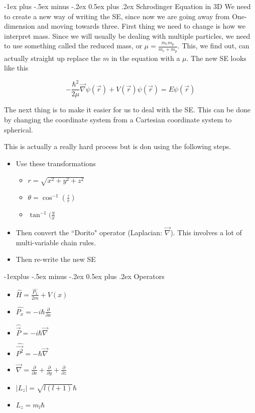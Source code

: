 \documentclass[10pt,landscape]{article}
\makeatletter
\renewcommand{\section}{\@startsection{section}{1}{0mm}%
                                {-1ex plus -.5ex minus -.2ex}%
                                {0.5ex plus .2ex}%
                                {\normalfont\large\bfseries}}
\renewcommand{\subsection}{\@startsection{subsection}{2}{0mm}%
                                {-1explus -.5ex minus -.2ex}%
                                {0.5ex plus .2ex}%
                                {\normalfont\normalsize\bfseries}}
\makeatother
\begin{document}
\begin{multicols}{3}
\section{Schrodinger Equation in 3D}
We need to create a new way of writing the SE, since now we are going away from One-dimension and moving towards three. First thing we need to change is how we interpret mass. Since we will usually be dealing with multiple particles, we need to use something called the reduced mass, or $\mu=\frac{m_em_p}{m_e+m_p}$. This, we find out, can actually straight up replace the $m$ in the equation with a $\mu$. The new SE looks like this

\begin{equation*}
    -\frac{\hbar^2}{2\mu}\Vec{\nabla}\psi(\Vec{r})+V(\Vec{r})\psi(\Vec{r})=E\psi(\Vec{r})
\end{equation*}{}

The next thing is to make it easier for us to deal with the SE. This can be done by changing the coordinate system from a Cartesian coordinate system to spherical. 

This is actually a really hard process but is don using the following steps.
\begin{itemize}
    \item Use these transformations
    \begin{itemize}
        \item $r=\sqrt{x^2+y^2+z^2}$
        \item $\theta=\cos^{-1}(\frac{z}{r})$
        \item $\tan^{-1}(\frac{y}{x}$
    \end{itemize}{}
    \item Then convert the ``Dorito" operator (Laplacian: $\Vec{\nabla}$). This involves a lot of multi-variable chain rules.
    \item Then re-write the new SE
\end{itemize}{}
\subsection{Operators}
\begin{itemize}
    \item $\hat{H}=\frac{\hat{P_x}}{2m}+V(x)$
    \item  $\hat{P_x}=-i\hbar\frac{\partial}{\partial x}$
    \item $\hat{\Vec{P}}=-i\hbar\Vec{\nabla}$
    \item $\hat{\Vec{P^2}}=-\hbar\Vec{\nabla}$
    \item  $\vec{\nabla}=\frac{\partial}{\partial x}+\frac{\partial}{\partial y}+\frac{\partial}{\partial z}$
    \item $|L_z|=\sqrt{l(l+1)}\hbar$
    \item $L_z=m_l\hbar$
\end{itemize}{}

\end{multicols}
\end{document}
